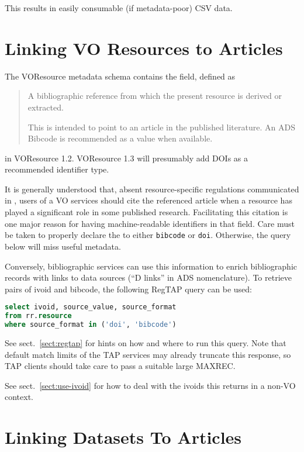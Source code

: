\documentclass[11pt,a4paper]{ivoa}
\begin{document}
This results in easily consumable (if metadata-poor) CSV data.

\section{Linking VO Resources to Articles}

The VOResource metadata schema \citep{2018ivoa.spec.0625P} contains the
 field, defined as

\begin{quotation}
\noindent A bibliographic reference from which the present resource is
derived or extracted.

\noindent This is intended to point to an article in the published
literature. An ADS Bibcode is recommended as a value when available.
\end{quotation}

\noindent in VOResource 1.2.  VOResource 1.3 will presumably add DOIs as a
recommended identifier type.

It is generally understood that, absent resource-specific regulations
communicated in , users of a VO services should cite the
referenced article when a resource has played a significant role in some
published research.  Facilitating this citation is one major reason for
having machine-readable identifiers in that field.  Care must be taken
to properly declare the  to either \verb|bibcode|
or \verb|doi|. Otherwise, the query below will miss useful metadata.

Conversely, bibliographic services can use this information to enrich
bibliographic records with links to data sources (``D links'' in ADS
nomenclature).  To retrieve pairs of ivoid and bibcode, the following
RegTAP \citep{2019ivoa.spec.1011D} query can be used:

\begin{lstlisting}[language=SQL]
select ivoid, source_value, source_format
from rr.resource
where source_format in ('doi', 'bibcode')
\end{lstlisting}

See sect.~\ref{sect:regtap} for hints on how and where to run this
query.
Note that default match limits of the TAP services may already
truncate this response, so TAP clients should take care to pass a
suitable large MAXREC.

See sect.~\ref{sect:use-ivoid} for how to deal with the ivoids this
returns in a non-VO context.


\section{Linking Datasets To Articles}
\label{sect:res-art}
\end{document}
